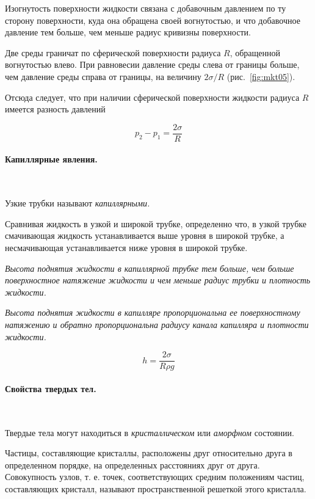 \documentclass[a4paper,12pt]{article}
\begin{document}
		\vspace{15pt}
		Изогнутость поверхности жидкости связана с добавочным давлением по ту сторону поверхности, 
		куда она обращена своей вогнутостью, и что добавочное давление тем больше, чем меньше 
		радиус кривизны поверхности.

		Две среды граничат по сферической поверхности радиуса $R$, обращенной вогнутостью влево. 
		При равновесии давление среды слева от границы больше, чем давление среды справа от границы, 
		на величину $2 \sigma / R$ (рис.~\ref{fig:mkt05}).

		Отсюда следует, что при наличии сферической поверхности жидкости радиуса $R$ имеется разность 
		давлений

		\begin{equation}
			p_2-p_1 = \frac{2 \sigma}{R}
		\end{equation}

		\clearpage
		\paragraph{Капиллярные явления.} \

		Узкие трубки называют \textit{капиллярными.}

		Сравнивая жидкость в узкой и широкой трубке, определенно что, в узкой трубке смачивающая 
		жидкость устанавливается выше уровня в широкой трубке, а несмачивающая устанавливается 
		ниже уровня в широкой трубке. 
		
		\textit{Высота поднятия жидкости в капиллярной трубке тем больше, чем больше поверхностное 
		натяжение жидкости и чем меньше радиус трубки и плотность жидкости.}

		\textit{Высота поднятия жидкости в капилляре пропорциональна ее поверхностному натяжению и 
		обратно пропорциональна радиусу канала капилляра и плотности жидкости.}

		\begin{equation}
			h = \frac{2 \sigma}{R \rho g}
		\end{equation}


		\clearpage

		\paragraph{Свойства твердых тел.} \

		Твердые тела могут находиться в \textit{кристаллическом} или \textit{аморфном} состоянии.

		Частицы, составляющие кристаллы, расположены друг относительно друга в определенном 
		порядке, на определенных расстояниях друг от друга. Совокупность узлов, т. е. точек, 
		соответствующих средним положениям частиц, составляющих кристалл, называют 
		пространственной решеткой этого кристалла.
		
\end{document}
